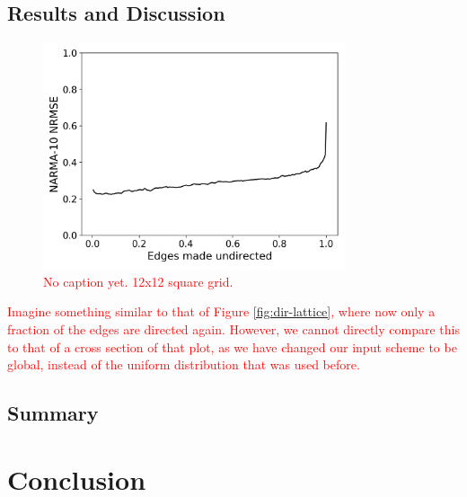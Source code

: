 \subsection{Results and Discussion}

\begin{figure}
  \centering
  \includegraphics[width=3.5in]{figures/undir-performance.png}
  \caption{
    \textcolor{red}{
      No caption yet. 12x12 square grid.
    }
  }
  \label{fig:undirection-performance}
\end{figure}

\textcolor{red}{
  Imagine something similar to that of Figure \ref{fig:dir-lattice}, where now
only a fraction of the edges are directed again. However, we cannot directly
compare this to that of a cross section of that plot, as we have changed our
input scheme to be global, instead of the uniform distribution that was used
before.
}

\subsection{Summary}

\section{Conclusion}


